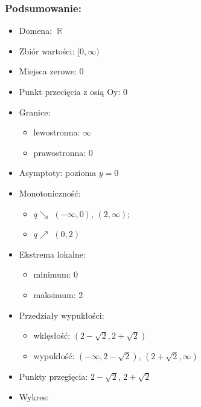 \documentclass[12pt]{article}
\DeclareMathOperator{\R}{\mathbb{R}}
\begin{document}
\subsubsection*{Podsumowanie:}
\begin{itemize}
    \item[] Domena: $\R$
    \item[] Zbiór wartości: $[0, \infty)$
    \item[] Miejsca zerowe: $0$
    \item[] Punkt przecięcia z osią Oy: $0$
    \item[] Granice:
        \begin{itemize}
            \item[] lewostronna: $\infty$
            \item[] prawostronna: $0$
        \end{itemize}
    \item[] Asymptoty: pozioma $y=0$
    \item[] Monotoniczność:
        \begin{itemize}
            \item[] $q \searrow$ $(-\infty,0)$, $(2,\infty)$;
            \item[] $q \nearrow$ $(0,2)$
        \end{itemize}
    \item[] Ekstrema lokalne:
        \begin{itemize}
            \item[] minimum:  0
            \item[] maksimum: 2
        \end{itemize}
    \item[] Przedziały wypukłości:
        \begin{itemize}
            \item[] wklęsłość: $(2-\sqrt{2}, 2+\sqrt{2})$
            \item[] wypukłość: $(-\infty, 2-\sqrt{2})$, $(2+\sqrt{2}, \infty)$
        \end{itemize}
    \item[] Punkty przegięcia: $2 - \sqrt{2}$, $2 + \sqrt{2}$
    \item[] Wykres:
        \begin{figure}[h!]
            \centering
        \end{figure}
\end{itemize}
\end{document}
